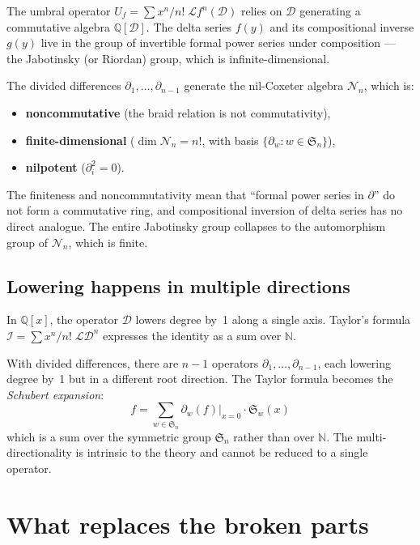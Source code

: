 \documentclass[11pt]{amsart}
\theoremstyle{definition}
\newcommand{\N}{\mathbb{N}}
\newcommand{\Q}{\mathbb{Q}}
\newcommand{\fS}{\mathfrak{S}}
\newcommand{\cL}{\mathcal{L}}
\newcommand{\cD}{\mathcal{D}}
\newcommand{\cN}{\mathcal{N}}
\begin{document}
The umbral operator $U_f = \sum x^n/n!\; \cL f^n(\cD)$ relies on
$\cD$ generating a commutative algebra $\Q[\cD]$. The delta series
$f(y)$ and its compositional inverse $g(y)$ live in the group of
invertible formal power series under composition --- the Jabotinsky
(or Riordan) group, which is infinite-dimensional.

The divided differences $\partial_1, \dots, \partial_{n-1}$ generate
the nil-Coxeter algebra $\cN_n$, which is:
\begin{itemize}
  \item \textbf{noncommutative} (the braid relation is not
    commutativity),
  \item \textbf{finite-dimensional} ($\dim \cN_n = n!$, with basis
    $\{\partial_w : w \in \fS_n\}$),
  \item \textbf{nilpotent} ($\partial_i^2 = 0$).
\end{itemize}

The finiteness and noncommutativity mean that ``formal power series
in $\partial$'' do not form a commutative ring, and compositional
inversion of delta series has no direct analogue. The entire
Jabotinsky group collapses to the automorphism group of $\cN_n$,
which is finite.

\subsection{Lowering happens in multiple directions}

In $\Q[x]$, the operator $\cD$ lowers degree by~1 along a single
axis. Taylor's formula
$\mathcal{I} = \sum x^n/n!\; \cL \cD^n$ expresses the identity as
a sum over $\N$.

With divided differences, there are $n - 1$ operators
$\partial_1, \dots, \partial_{n-1}$, each lowering degree by~1
but in a different root direction. The Taylor formula becomes the
\emph{Schubert expansion}:
\[
  f = \sum_{w \in \fS_n} \partial_w(f)\big|_{x = 0} \cdot
  \mathfrak{S}_w(x)
\]
which is a sum over the symmetric group $\fS_n$ rather than over
$\N$. The multi-directionality is intrinsic to the theory and
cannot be reduced to a single operator.

\section{What replaces the broken parts}
\end{document}
